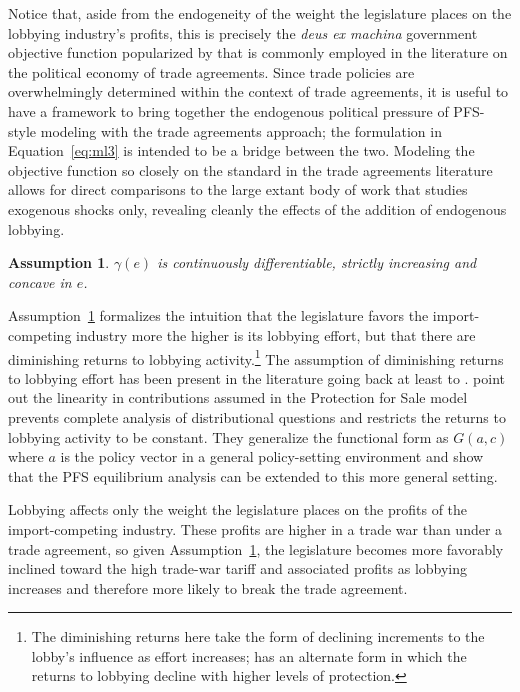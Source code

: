 \documentclass[authoryear, review]{elsarticle}
\newtheorem{assumption}{Assumption}
\newcommand{\ga}{\gamma}
\begin{document}
Notice that, aside from the endogeneity of the weight the legislature places on the lobbying industry's profits, this is precisely the \textit{deus ex machina} government objective function popularized by \citet{baldwin} that is commonly employed in the literature on the political economy of trade agreements. Since trade policies are overwhelmingly determined within the context of trade agreements, it is useful to have a framework to bring together the endogenous political pressure of PFS-style modeling with the trade agreements approach; the formulation in Equation~\ref{eq:ml3} is intended to be a bridge between the two. Modeling the objective function so closely on the standard in the trade agreements literature allows for direct comparisons to the large extant body of work that studies exogenous shocks only, revealing cleanly the effects of the addition of endogenous lobbying.

\begin{assumption}
  $\ga(e)$ is continuously differentiable, strictly increasing and concave in $e$.
  \label{as:ga_c3}
\end{assumption}

Assumption~\ref{as:ga_c3} formalizes the intuition that the legislature favors the import-competing industry more the higher is its lobbying effort, but that there are diminishing returns to lobbying activity.\footnote{The diminishing returns here take the form of declining increments to the lobby's influence as effort increases; \citet{ethier2012} has an alternate form in which the returns to lobbying decline with higher levels of protection.} The assumption of diminishing returns to lobbying effort has been present in the literature going back at least to \citet{fw}. \citet{dgh97} point out the linearity in contributions assumed in the Protection for Sale model prevents complete analysis of distributional questions and restricts the returns to lobbying activity to be constant. They generalize the functional form as $G(a,c)$ where $a$ is the policy vector in a general policy-setting environment and show that the PFS equilibrium analysis can be extended to this more general setting.

Lobbying affects only the weight the legislature places on the profits of the import-competing industry. These profits are higher in a trade war than under a trade agreement, so given Assumption~\ref{as:ga_c3}, the legislature becomes more favorably inclined toward the high trade-war tariff and associated profits as lobbying increases and therefore more likely to break the trade agreement.
\end{document}
